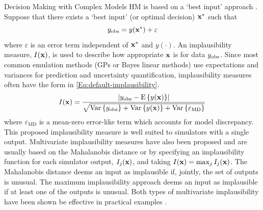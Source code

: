 \begin{chapter}{Decision Making with Complex Models \label{Chap:optimisation}}
HM is based on a `best input' approach \citep{Ohagan01, williamson2013a}. Suppose that there exists a `best input' (or optimal decision) $\mathbf{x}^{*}$ such that
\begin{equation}
 y_{\text{obs}} = y(\mathbf{x}^{*}) + \varepsilon
\end{equation}
where $\varepsilon$ is an error term independent of $\mathbf{x}^{*}$ and $y(\cdot)$.  An implausibility measure, $I(\mathbf{x})$, is used to describe how appropriate $\mathbf{x}$ is for data $y_{\text{obs}}$. Since most common emulation methods (GPs or Bayes linear methods) use expectations and variances for prediction and uncertainty quantification, implausibility measures often have the form in \cref{Eq:default-implausibility}.
\begin{equation}
 I(\mathbf{x}) = \frac{| y_{\text{obs}} - \textrm{E}\, \{y(\mathbf{x})\}|}{\sqrt{\mathrm{Var}\, \{y_{\text{obs}}\} + \mathrm{Var}\,\{y(\mathbf{x})\} + \mathrm{Var}\,\{ \varepsilon_{\text{MD}} \} }} \label{Eq:default-implausibility}
\end{equation}
where $\varepsilon_{\text{MD}}$ is a mean-zero error-like term which accounts for model discrepancy.  This proposed implausibility measure is well suited to simulators with a single output. Multivariate implausibility measures have also been proposed and are usually based on the Mahalanobis distance or by specifying an implausibility function for each simulator output, $I_j(\mathbf{x})$, and taking $I(\mathbf{x}) = \max_j I_j(\mathbf{x})$. The Mahalanobis distance deems an input as implausible if, jointly, the set of outputs is unusual. The maximum implausibility approach deems an input as implausible if at least one of the outputs is unusual. Both types of multivariate implausibility have been shown be effective in practical examples \citep{Vernon2010,Williamson2017}.


\end{chapter}
